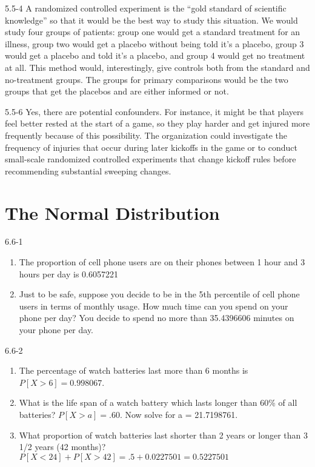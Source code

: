 \begin{exsol@solution}{5.5-4}
A randomized controlled experiment is the ``gold standard of scientific knowledge'' so that it would be the best way to study this situation. We would study four groups of patients: group one would get a standard treatment for an illness, group two would get a placebo without being told it's a placebo, group 3 would get a placebo and told it's a placebo, and group 4 would get no treatment at all. This method would, interestingly, give controls both from the standard and no-treatment groups. The groups for primary comparisons would be the two groups that get the placebos and are either informed or not.

\end{exsol@solution}
\begin{exsol@solution}{5.5-6}
Yes, there are potential confounders. For instance, it might be that players feel better rested at the start of a game, so they play harder and get injured more frequently because of this possibility. The organization could investigate the frequency of injuries that occur during later kickoffs in the game or to conduct small-scale randomized controlled experiments that change kickoff rules before recommending substantial sweeping changes.

\end{exsol@solution}
\setcounter{chapter}{6}\chapter{The Normal Distribution}
\begin{exsol@solution}{6.6-1}

\begin{enumerate}
	\item The proportion of cell phone users are on their phones between 1 hour
and 3 hours per day is 0.6057221
  \item Just to be safe, suppose you decide to be in the 5th percentile of
cell phone users in terms of monthly usage.  How much time can you spend on your phone per day? You decide to spend no more than 35.4396606 minutes on your phone per day.
	\end{enumerate}
\end{exsol@solution}
\begin{exsol@solution}{6.6-2}


\begin{enumerate}
	\item The percentage of watch batteries last more than 6 months is $P[ X > 6] = 0.998067$.
	\item What is the life span of a watch battery which lasts longer than 60\% of all batteries?  $P[X > a] = .60$. Now solve for a = 21.7198761.
	\item What proportion of watch batteries last shorter than 2 years or longer
than 3 1/2 years (42 months)?
$P[X < 24] + P[X > 42] = .5 + 0.0227501 = 0.5227501$
 \end{enumerate}

\end{exsol@solution}
